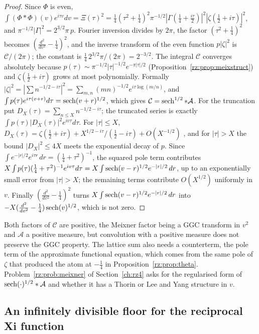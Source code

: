 \begin{proof}
Since $\Phi$ is even, $\int(\Phi*\Phi)(v)e^{i\tau v}dv=\Xi(\tau)^2=\frac14(\tau^2+\frac14)^2\pi^{-1/2}|\Gamma(\frac14+\frac{i\tau}2)|^2|\zeta(\frac12+i\tau)|^2$, and $\pi^{-1/2}|\Gamma|^2=2^{3/2}\pi\,p$. Fourier inversion divides by $2\pi$, the factor $(\tau^2+\frac14)^2$ becomes $(\frac{d^2}{dv^2}-\frac14)^2$, and the inverse transform of the even function $p|\zeta|^2$ is $\mathcal C/(2\pi)$; the constant is $\frac14\,2^{3/2}\pi/(2\pi)=2^{-3/2}$. The integral $\mathcal C$ converges absolutely because $p(\tau)\sim\pi^{-1/2}|\tau|^{-1/2}e^{-\pi|\tau|/2}$ (Proposition~\ref{rz:prop:meixstruct}) and $\zeta(\frac12+i\tau)$ grows at most polynomially. Formally $|\zeta|^2=|\sum n^{-1/2-i\tau}|^2=\sum_{m,n}(mn)^{-1/2}e^{i\tau\log(m/n)}$, and $\int p(\tau)e^{i\tau(v+r)}d\tau=\operatorname{sech}(v+r)^{1/2}$, which gives $\mathcal C=\operatorname{sech}^{1/2}*\mathcal A$. For the truncation put $D_X(\tau)=\sum_{n\le X}n^{-1/2-i\tau}$; the truncated series is exactly $\int p(\tau)|D_X(\tau)|^2e^{iv\tau}d\tau$. For $|\tau|\le X$, $D_X(\tau)=\zeta(\frac12+i\tau)+X^{1/2-i\tau}/(\frac12-i\tau)+O(X^{-1/2})$ \cite[Theorem 4.11]{Titchmarsh}, and for $|\tau|>X$ the bound $|D_X|^2\le4X$ meets the exponential decay of $p$. Since $\int e^{-|r|/2}e^{i\tau r}\,dr=(\frac14+\tau^2)^{-1}$, the squared pole term contributes $X\int p(\tau)(\frac14+\tau^2)^{-1}e^{iv\tau}d\tau=X\int\operatorname{sech}(v-r)^{1/2}e^{-|r|/2}\,dr$, up to an exponentially small error from $|\tau|>X$; the remaining terms contribute $O(X^{1/2})$ uniformly in $v$. Finally $(\frac{d^2}{dv^2}-\frac14)^2$ turns $X\int\operatorname{sech}(v-r)^{1/2}e^{-|r|/2}\,dr$ into $-X(\frac{d^2}{dv^2}-\frac14)\operatorname{sech}(v)^{1/2}$, which is not zero.
\end{proof}

Both factors of $\mathcal C$ are positive, the Meixner factor being a GGC transform in $v^2$ and $\mathcal A$ a positive measure, but convolution with a positive measure does not preserve the GGC property. The lattice sum also needs a counterterm, the pole term of the approximate functional equation, which comes from the same pole of $\zeta$ that produced the atom at $-\frac14$ in Proposition~\ref{rz:prop:theta}. Problem~\ref{rz:prob:meixner} of Section~\ref{ch:rz4} asks for the regularised form of $\operatorname{sech}(\cdot)^{1/2}*\mathcal A$ and whether it has a Thorin or Lee and Yang structure in $v$.

\subsection{An infinitely divisible floor for the reciprocal Xi function}\label{rz:sec:floor}

